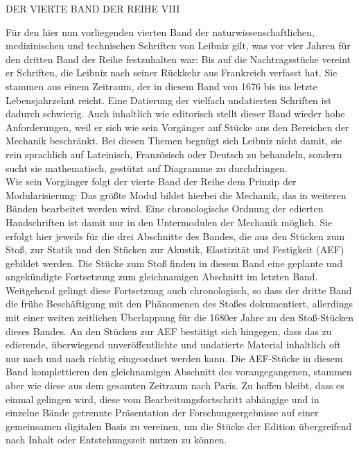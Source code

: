 

\vspace{-2.0em}
\noindent\uppercase{Der vierte Band der Reihe VIII}
\vspace{0.5em}
\par\noindent
Für den hier nun vorliegenden vierten Band der naturwissenschaftlichen, medizinischen und technischen Schriften von Leibniz gilt, was vor vier Jahren  für den dritten Band der Reihe festzuhalten war: Bis auf die Nachtragsstücke vereint er Schriften, die Leibniz nach seiner Rückkehr aus Frankreich verfasst hat. Sie stammen aus einem Zeitraum, der in diesem Band von 1676 bis ins letzte Lebensjahrzehnt reicht. Eine Datierung der vielfach undatierten Schriften ist dadurch schwierig. Auch inhaltlich wie editorisch stellt dieser Band wieder hohe Anforderungen, weil er sich wie sein Vorgänger auf Stücke aus den Bereichen der Mechanik beschränkt. Bei diesen Themen begnügt sich Leibniz nicht damit, sie rein sprachlich auf Lateinisch, Französisch oder Deutsch zu behandeln, sondern sucht sie mathematisch, gestützt auf Diagramme zu durchdringen.%
\\ \indent
Wie sein Vorgänger folgt der vierte Band der Reihe dem Prinzip der Modularisierung: Das größte Modul bildet hierbei die Mechanik, das in weiteren Bänden bearbeitet werden wird. Eine chronologische Ordnung der edierten Handschriften ist damit nur in den Untermodulen der Mechanik möglich. Sie erfolgt hier jeweils für die drei Abschnitte des Bandes, die aus den Stücken zum Stoß, zur Statik und den Stücken zur Akustik, Elastizität und Festigkeit (AEF) gebildet werden. Die Stücke zum Stoß finden in diesem Band eine geplante und angekündigte Fortsetzung zum gleichnamigen Abschnitt im letzten Band. Weitgehend gelingt diese Fortsetzung auch chronologisch, so dass der dritte Band die frühe Beschäftigung mit den Phänomenen des Stoßes dokumentiert, allerdings mit einer weiten zeitlichen Überlappung für die 1680er Jahre zu den Stoß-Stücken dieses Bandes. An den Stücken zur AEF bestätigt sich hingegen, dass das zu edierende, überwiegend unveröffentlichte und undatierte Material inhaltlich oft nur nach und nach richtig eingeordnet werden kann. Die AEF-Stücke in diesem Band komplettieren den gleichnamigen Abschnitt des vorangegangenen, stammen aber wie diese aus dem gesamten Zeitraum nach Paris. Zu hoffen bleibt, dass es einmal gelingen wird, diese vom Bearbeitungsfortschritt abhängige und in einzelne Bände getrennte Präsentation der Forschungsergebnisse auf einer gemeinsamen digitalen Basis zu vereinen, um die Stücke der Edition übergreifend nach Inhalt oder Entstehungszeit nutzen zu können.%
